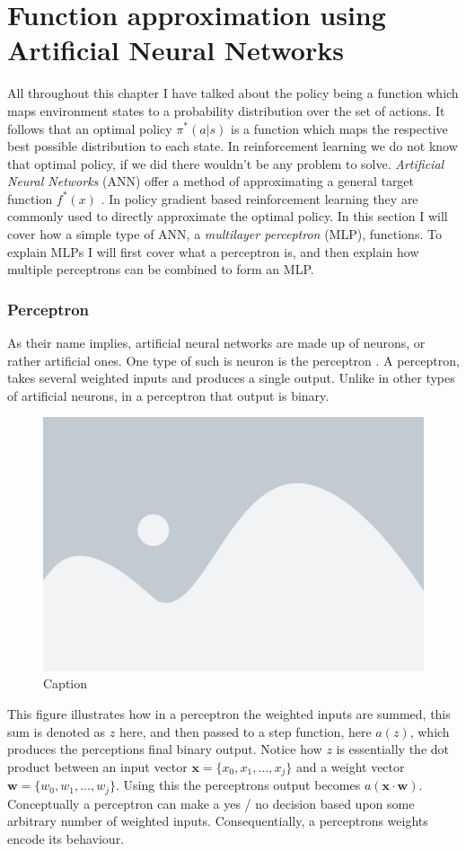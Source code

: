 \newpage
\section{Function approximation using Artificial Neural Networks}\label{sec:neural_networks}
All throughout this chapter I have talked about the policy being a function which maps environment states to a probability distribution over the set of actions. It follows that an optimal policy $\pi^*(a|s)$ is a function which maps the respective best possible distribution to each state. In reinforcement learning we do not know that optimal policy, if we did there wouldn't be any problem to solve. \textit{Artificial Neural Networks} (ANN) offer a method of approximating a general target function $f^*(x)$ \cite[p. 164]{Goodfellow-et-al-2016}. In policy gradient based reinforcement learning they are commonly used to directly approximate the optimal policy. In this section I will cover how a simple type of ANN, a \textit{multilayer perceptron} (MLP), functions. To explain MLPs I will first cover what a perceptron is, and then explain how multiple perceptrons can be combined to form an MLP.

\subsubsection{Perceptron}\label{subsubsec:nn:comp:perceptron}
As their name implies, artificial neural networks are made up of neurons, or rather artificial ones. One type of such is neuron is the perceptron \cite[chap. 1]{nielsen_neural_2015}. A perceptron, takes several weighted inputs and produces a single output. Unlike in other types of artificial neurons, in a perceptron that output is binary. 

\begin{figure}[H]
    \centering
    \includegraphics[width=0.6\linewidth]{figures/placeholder.png}
    \caption{Caption}
    \label{fig:my_label}
\end{figure}
\noindent
This figure illustrates how in a perceptron the weighted inputs are summed, this sum is denoted as $z$ here, and then passed to a step function, here $a(z)$, which produces the perceptions final binary output. Notice how $z$ is essentially the dot product between an input vector $\mathbf{x} = \{x_0, x_1, \dots, x_j\}$ and a weight vector $\mathbf{w} = \{ w_0, w_1, \dots, w_j \}$. Using this the perceptrons output becomes $a(\mathbf{x} \cdot \mathbf{w})$. Conceptually a perceptron can make a yes / no decision based upon some arbitrary number of weighted inputs. Consequentially, a perceptrons weights encode its behaviour. 

